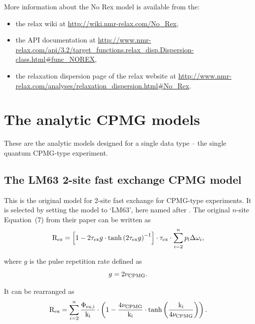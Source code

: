 More information about the No Rex model is available from the:
\begin{itemize}
  \item the relax wiki at \url{http://wiki.nmr-relax.com/No\_Rex},
  \item the API documentation at \url{http://www.nmr-relax.com/api/3.2/target\_functions.relax\_disp.Dispersion-class.html#func\_NOREX},
  \item the relaxation dispersion page of the relax website at \url{http://www.nmr-relax.com/analyses/relaxation\_dispersion.html#No\_Rex}.
\end{itemize}




\section{The analytic CPMG models}
\label{sect: dispersion: analytic CPMG models}

These are the analytic models designed for a single data type -- the single quantum CPMG-type experiment.



\subsection{The LM63 2-site fast exchange CPMG model}
\label{sect: dispersion: LM63 model}

This is the original model for 2-site fast exchange for CPMG-type experiments.
It is selected by setting the model to `LM63', here named after \citet{LuzMeiboom63}.
The original $n$-site Equation~(7) from their paper can be written as
\begin{equation}
    \mathrm{R}_{\textrm{ex}} = \left[ 1 - 2\tau_{\textrm{ex}} g \cdot \tanh \left( 2\tau_{\textrm{ex}} g \right)^{-1} \right] \cdot \tau_{\textrm{ex}} \cdot \sum_{i=2}^n p_{\textrm{i}}\Delta\omega_{i},
\end{equation}

where $g$ is the pulse repetition rate defined as
\begin{equation}
    g = 2\nu_{\textrm{CPMG}}.
\end{equation}

It can be rearranged as
\begin{equation} \label{eq: Luz-Meiboom}
    \mathrm{R}_{\textrm{ex}} = \sum_{i=2}^n \frac{\Phi_{\textrm{ex,i}}}{\textrm{k}_{\textrm{i}}} \cdot \left( 1 - \frac{4\nu_{\textrm{CPMG}}}{\textrm{k}_{\textrm{i}}} \cdot \tanh \left( \frac{\textrm{k}_{\textrm{i}}}{4\nu_{\textrm{CPMG}}} \right) \right).
\end{equation}


